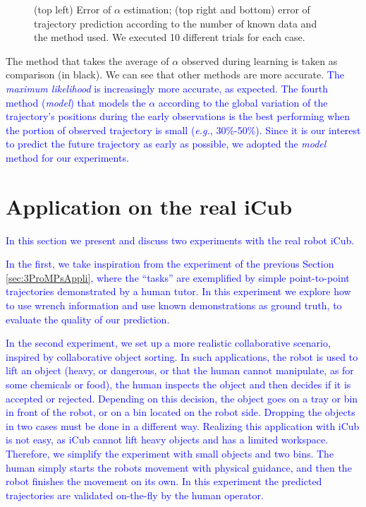 \documentclass[utf8]{frontiersSCNS} %
\newcommand{\rev}[1]{\textcolor{blue}{#1}}
\begin{document}
\begin{figure}[h]
\caption{(top left) Error of $\alpha$ estimation; (top right and bottom) error of trajectory prediction according to the number of known data and the method used. We executed 10 different trials for each case.}
\label{fig:analyseAlpha}
\end{figure}
The method that takes the average of $\alpha$ observed during learning is taken as comparison (in black). We can see that other methods are more accurate. \rev{The \textit{maximum likelihood} is increasingly more accurate, as expected. The fourth method (\textit{model}) that models the $\alpha$ according to the global variation of the trajectory's positions during the early observations is the best performing when the portion of observed trajectory is small (\textit{e.g.}, 30\%-50\%).  Since it is our interest to predict the future trajectory as early as possible, we adopted the \textit{model} method for our experiments.}



\section{Application on the real iCub}
\label{sec:appliRealIcub}

\rev{In this section we present and discuss two experiments with the real robot iCub.}

\rev{In the first, we take inspiration from the experiment of the previous Section \ref{sec:3ProMPsAppli}, where the ``tasks'' are exemplified by simple point-to-point trajectories demonstrated by a human tutor. In this experiment we explore how to use wrench information and use known demonstrations as ground truth, to evaluate the quality of our prediction.}


\rev{In the second experiment, we set up a more realistic collaborative scenario, inspired by collaborative object sorting. 
In such applications, the robot is used to lift an object (heavy, or dangerous, or that the human cannot manipulate, as for some chemicals or food), the human inspects the object and then decides if it is accepted or rejected. Depending on this decision, the object goes on a tray or bin in front of the robot, or on a bin located on the robot side. 
Dropping the objects in two cases must be done in a different way. Realizing this application with iCub is not easy, as iCub cannot lift heavy objects and has a limited workspace. Therefore, we simplify the experiment with small objects and two bins. The human simply starts the robots movement with physical guidance, and then the robot finishes the movement on its own.
In this experiment the predicted trajectories are validated on-the-fly by the human operator.}
\end{document}
